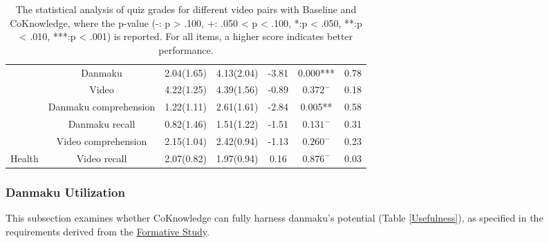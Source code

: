 \begin{table*}[]
\begin{tabular}{ccccccc}
                            & Danmaku                 & 2.04(1.65)                                                     & 4.13(2.04)                                                       & -3.81 & 0.000*** & 0.78 \\
                            & Video                   & 4.22(1.25)                                                     & 4.39(1.56)                                                       & -0.89  & $0.372^{-}$ & 0.18 \\
                            & Danmaku comprehension & 1.22(1.11)                                                     & 2.61(1.61)                                                       & -2.84 & 0.005** & 0.58 \\
                            & Danmaku recall          & 0.82(1.46)                                                     & 1.51(1.22)                                                       & -1.51  & $0.131^{-}$ & 0.31 \\
                            & Video comprehension     & 2.15(1.04)                                                     & 2.42(0.94)                                                       & -1.13 & $0.260^{-}$ & 0.23 \\
\multirow{-7}{*}{Health}   & Video recall            & 2.07(0.82)                                                     & 1.97(0.94)                                                       & 0.16 & $0.876^{-}$ & 0.03 \\
\hline
\end{tabular}
\caption{The statistical analysis of quiz grades for different video pairs with Baseline and CoKnowledge, where the p-value (-: p > .100, +: .050 < p < .100, *:p < .050, **:p < .010, ***:p < .001) is reported. For all items, a higher score indicates better performance.}
\label{Video_type}
\end{table*}

\subsubsection{Danmaku Utilization}
\label{sec:danmaku-util}

This subsection examines whether CoKnowledge can fully harness danmaku's potential  (Table \ref{Usefulness}), as specified in the requirements derived from the \hyperref[formative-study]{Formative Study}. 

